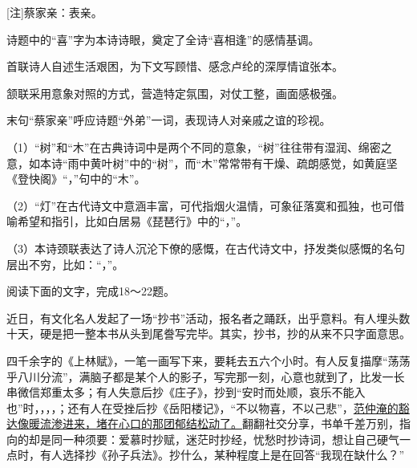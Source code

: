\documentclass[11pt,a4paper]{ctexart}
\begin{document}
[注]蔡家亲：表亲。

\begin{choices}
\item 诗题中的“喜”字为本诗诗眼，奠定了全诗“喜相逢”的感情基调。
\item 首联诗人自述生活艰困，为下文写顾惜、感念卢纶的深厚情谊张本。
\item 颔联采用意象对照的方式，营造特定氛围，对仗工整，画面感极强。
\item 末句“蔡家亲”呼应诗题“外弟”一词，表现诗人对亲戚之谊的珍视。
\end{choices}


\par\vspace{2.2em}



（1）“树”和“木”在古典诗词中是两个不同的意象，“树”往往带有湿润、绵密之意，如本诗“雨中黄叶树”中的“树”，而“木”常常带有干燥、疏朗感觉，如黄庭坚《登快阁》“\blank[6.5em]，\blank[6.5em]”句中的“木”。

（2）“灯”在古代诗文中意涵丰富，可代指烟火温情，可象征落寞和孤独，也可借喻希望和指引，比如白居易《琵琶行》中的“\blank[6.5em]，\blank[6.5em]”。

（3）本诗颈联表达了诗人沉沦下僚的感慨，在古代诗文中，抒发类似感慨的名句层出不穷，比如：“\blank[6.5em]，\blank[6.5em]”。

阅读下面的文字，完成18～22题。

近日，有文化名人发起了一场“抄书”活动，报名者之踊跃，出乎意料。有人埋头数十天，硬是把一整本书从头到尾誊写完毕。其实，抄书，抄的从来不只字面意思。

四千余字的《上林赋》，一笔一画写下来，要耗去五六个小时。有人反复描摩“荡荡乎八川分流”，满脑子都是某个人的影子，写完那一刻，心意也就到了，比发一长串微信郑重太多；有人失意后抄《庄子》，抄到“安时而处顺，哀乐不能入也”时，\blank[6.5em]，\blank[6.5em]，\blank[6.5em]，\blank[6.5em]；还有人在受挫后抄《岳阳楼记》，“不以物喜，不以己悲”，\uline{范仲淹的豁达像暖流渗进来，堵在心口的那团郁结松动了。}翻翻社交分享，书单千差万别，指向的却是同一种须要：爱慕时抄赋，迷茫时抄经，忧愁时抄诗词，想让自己硬气一点时，有人选择抄《孙子兵法》。抄什么，某种程度上是在回答“我现在缺什么？”
\end{document}
